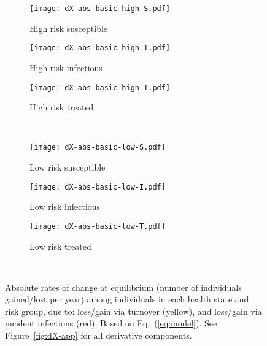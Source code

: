 \begin{figure}
  \begingroup\centering
  \begin{subfigure}{0.33\linewidth}
    \texttt{[image: dX-abs-basic-high-S.pdf]}
    \caption{High risk susceptible}
    \label{fig:dX-high-S}
  \end{subfigure}%
  \begin{subfigure}{0.33\linewidth}
    \texttt{[image: dX-abs-basic-high-I.pdf]}
    \caption{High risk infectious}
    \label{fig:dX-high-I}
  \end{subfigure}%
  \begin{subfigure}{0.33\linewidth}
    \texttt{[image: dX-abs-basic-high-T.pdf]}
    \caption{High risk treated}
    \label{fig:dX-high-T}
  \end{subfigure}\\
  \begin{subfigure}{0.33\linewidth}
    \texttt{[image: dX-abs-basic-low-S.pdf]}
    \caption{Low risk susceptible}
    \label{fig:dX-low-S}
  \end{subfigure}%
  \begin{subfigure}{0.33\linewidth}
    \texttt{[image: dX-abs-basic-low-I.pdf]}
    \caption{Low risk infectious}
    \label{fig:dX-low-I}
  \end{subfigure}%
  \begin{subfigure}{0.33\linewidth}
    \texttt{[image: dX-abs-basic-low-T.pdf]}
    \caption{Low risk treated}
    \label{fig:dX-low-T}
  \end{subfigure}\\
  \endgroup
  \caption{Absolute rates of change at equilibrium
    (number of individuals gained/lost per year)
    among individuals in each health state and risk group, due to:
    loss/gain via turnover (yellow), and
    loss/gain via incident infections (red).
    Based on Eq.~(\ref{eq:model}).
    See Figure~\ref{fig:dX-app} for all derivative components.}
  \label{fig:dX}
  \footnotesize
\end{figure}

